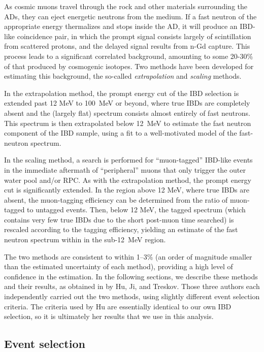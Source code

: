 \documentclass[../thesis.tex]{subfiles}
\begin{document}
As cosmic muons travel through the rock and other materials surrounding the ADs, they can eject energetic neutrons from the medium. If a fast neutron of the appropriate energy thermalizes and stops inside the AD, it will produce an IBD-like coincidence pair, in which the prompt signal consists largely of scintillation from scattered protons, and the delayed signal results from n-Gd capture. This process leads to a significant correlated background, amounting to some 20-30\% of that produced by cosmogenic isotopes. Two methods have been developed for estimating this background, the so-called \emph{extrapolation} and \emph{scaling} methods.

In the extrapolation method, the prompt energy cut of the IBD selection is extended past 12 MeV to 100~MeV or beyond, where true IBDs are completely absent and the (largely flat) spectrum consists almost entirely of fast neutrons. This spectrum is then extrapolated below 12~MeV to estimate the fast neutron component of the IBD sample, using a fit to a well-motivated model of the fast-neutron spectrum.

In the scaling method, a search is performed for ``muon-tagged'' IBD-like events in the immediate aftermath of ``peripheral'' muons that only trigger the outer water pool and/or RPC. As with the extrapolation method, the prompt energy cut is significantly extended. In the region above 12 MeV, where true IBDs are absent, the muon-tagging efficiency can be determined from the ratio of muon-tagged to untagged events. Then, below 12 MeV, the tagged spectrum (which contains very few true IBDs due to the short post-muon time searched) is rescaled according to the tagging efficiency, yielding an estimate of the fast neutron spectrum within in the sub-12~MeV region.

The two methods are consistent to within 1--3\% (an order of magnitude smaller than the estimated uncertainty of each method), providing a high level of confidence in the estimation. In the following sections, we describe these methods and their results, as obtained in \cite{fastn} by Hu, Ji, and Treskov. Those three authors each independently carried out the two methods, using slightly different event selection criteria. The criteria used by Hu are essentially identical to our own IBD selection, so it is ultimately her results that we use in this analysis.

\subsection{Event selection}
\label{sec:fastn_sel}
\end{document}
